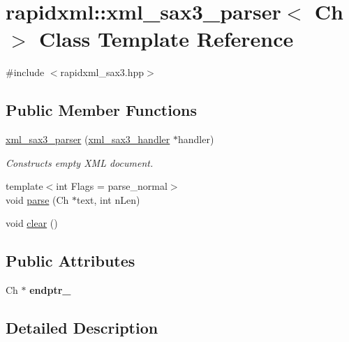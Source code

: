 \hypertarget{classrapidxml_1_1xml__sax3__parser}{}\section{rapidxml\+:\+:xml\+\_\+sax3\+\_\+parser$<$ Ch $>$ Class Template Reference}
\label{classrapidxml_1_1xml__sax3__parser}


{\ttfamily \#include $<$rapidxml\+\_\+sax3.\+hpp$>$}

\subsection*{Public Member Functions}
\begin{DoxyCompactItemize}
\item 
\mbox{\label{classrapidxml_1_1xml__sax3__parser_a30f45db9ee112913d37f10facdc02dd6}} 
\hyperlink{classrapidxml_1_1xml__sax3__parser_a30f45db9ee112913d37f10facdc02dd6}{xml\+\_\+sax3\+\_\+parser} (\hyperlink{classrapidxml_1_1xml__sax3__handler}{xml\+\_\+sax3\+\_\+handler} $\ast$handler)
\begin{DoxyCompactList}\small\item\em Constructs empty X\+ML document. \end{DoxyCompactList}\item 
{\footnotesize template$<$int Flags = parse\+\_\+normal$>$ }\\void \hyperlink{classrapidxml_1_1xml__sax3__parser_a9195e59c16ee5bec5a0d68bea48111fe}{parse} (Ch $\ast$text, int n\+Len)
\item 
void \hyperlink{classrapidxml_1_1xml__sax3__parser_a94691160be027ce7160efc1af6267c79}{clear} ()
\end{DoxyCompactItemize}
\subsection*{Public Attributes}
\begin{DoxyCompactItemize}
\item 
\mbox{\label{classrapidxml_1_1xml__sax3__parser_a9bd8e15e62107592d867300016a91767}} 
Ch $\ast$ {\bfseries endptr\+\_\+}
\end{DoxyCompactItemize}


\subsection{Detailed Description}
